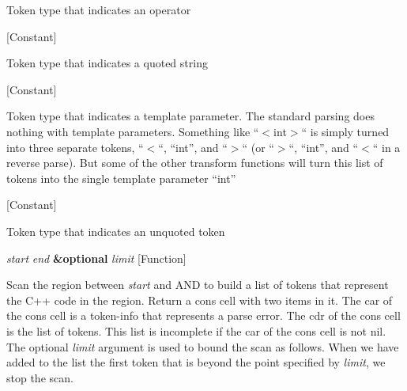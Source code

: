 \begin{doc-string}
Token type that indicates an operator
\end{doc-string}

\vspace{1em}
\noindent
{}
\usebox{\funcname}
 \hfill [Constant]

\begin{doc-string}
Token type that indicates a quoted string
\end{doc-string}

\vspace{1em}
\noindent
{}
\usebox{\funcname}
 \hfill [Constant]

\begin{doc-string}
Token type that indicates a template parameter.  The standard parsing does nothing
with template parameters.  Something like ``$<$int$>$`` is simply turned into three separate
tokens, ``$<$``, ``int'', and ``$>$`` (or ``$>$``, ``int'', and ``$<$`` in a reverse parse).
But some of the other transform functions will turn this list of tokens into the single
template parameter ``int''
\end{doc-string}

\vspace{1em}
\noindent
{}
\usebox{\funcname}
 \hfill [Constant]

\begin{doc-string}
Token type that indicates an unquoted token
\end{doc-string}

\vspace{1em}
\noindent
{}
\usebox{\funcname}\emph{start} \emph{end} \textbf{\&optional} \emph{limit}
 \hfill [Function]

\begin{doc-string}
Scan the region between \emph{start} and AND to build a list of tokens that represent the C++
code in the region.  Return a cons cell with two items in it.  The car of the cons cell
is a token-info that represents a parse error.  The cdr of the cons cell is the list of
tokens.  This list is incomplete if the car of the cons cell is not nil.  The optional
\emph{limit} argument is used to bound the scan as follows.  When we have added to the list the
first token that is beyond the point specified by \emph{limit}, we stop the scan.
\end{doc-string}


